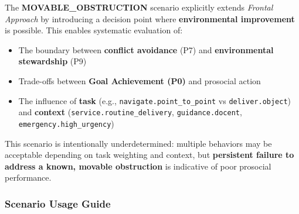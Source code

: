 \documentclass[utf8]{frontiers_suppmat} %
\providecommand{\tightlist}{%
  \setlength{\itemsep}{0pt}\setlength{\parskip}{0pt}}
\begin{document}
The \textbf{MOVABLE\_OBSTRUCTION} scenario explicitly extends
\emph{Frontal Approach} by introducing a decision point where
\textbf{environmental improvement} is possible. This enables systematic
evaluation of:

\begin{itemize}
\tightlist
\item
  The boundary between \textbf{conflict avoidance} (P7) and
  \textbf{environmental stewardship} (P9)
\item
  Trade-offs between \textbf{Goal Achievement (P0)} and prosocial action
\item
  The influence of \textbf{task} (e.g.,
  \texttt{navigate.point\_to\_point} vs
  \texttt{deliver.object}) and \textbf{context}
  (\texttt{service.routine\_delivery},
  \texttt{guidance.docent},
  \texttt{emergency.high\_urgency})
\end{itemize}

This scenario is intentionally underdetermined: multiple behaviors may
be acceptable depending on task weighting and context, but
\textbf{persistent failure to address a known, movable obstruction} is
indicative of poor prosocial performance.

\subsubsection{Scenario Usage Guide}\label{scenario-usage-guide}
\end{document}
